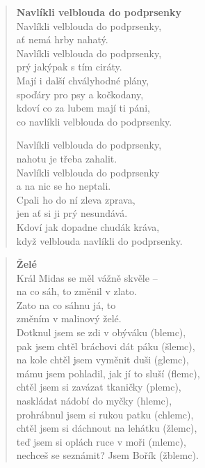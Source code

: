 \begin{verse}
\textbf{Navlíkli velblouda do podprsenky}\\
\smallskip
Navlíkli velblouda do podprsenky,\\
ať nemá hrby nahatý.\\
Navlíkli velblouda do podprsenky,\\
prý jakýpak s tím ciráty.\\
Mají i další chvályhodné plány,\\
spoďáry pro psy a kočkodany,\\
kdoví co za lubem mají ti páni,\\
co navlíkli velblouda do podprsenky.

\medskip

Navlíkli velblouda do podprsenky,\\
nahotu je třeba zahalit.\\
Navlíkli velblouda do podprsenky\\
a na nic se ho neptali.\\
Cpali ho do ní zleva zprava,\\
jen ať si ji prý nesundává.\\
Kdoví jak dopadne chudák kráva,\\
když velblouda navlíkli do podprsenky.
\end{verse}

\bigskip

\begin{verse}
\textbf{Želé}\\
\smallskip
Král Midas se měl vážně skvěle –\\
na co sáh, to změnil v zlato.  \\
Zato na co sáhnu já, to  \\
změním v malinový želé.\\
Dotknul jsem se zdi v obýváku (blemc),\\
pak jsem chtěl bráchovi dát páku (šlemc),\\
na kole chtěl jsem vyměnit duši (glemc),  \\
mámu jsem pohladil, jak jí to sluší (flemc),\\
chtěl jsem si zavázat tkaničky (plemc),\\
naskládat nádobí do myčky (hlemc),\\
prohrábnul jsem si rukou patku (chlemc),\\
chtěl jsem si dáchnout na lehátku (žlemc),\\
teď jsem si oplách ruce v moři (mlemc),\\
nechceš se seznámit? Jsem Bořík (žblemc).
\end{verse}
